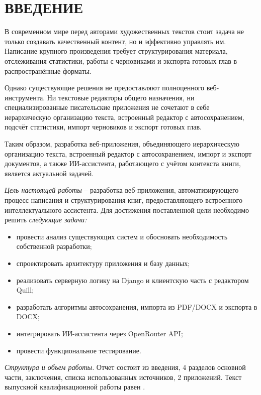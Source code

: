 \section*{ВВЕДЕНИЕ}

В современном мире перед авторами художественных текстов стоит задача не только создавать качественный контент, но и эффективно управлять им. Написание крупного произведения требует структурирования материала, отслеживания статистики, работы с черновиками и экспорта готовых глав в распространённые форматы.

Однако существующие решения не предоставляют полноценного веб-инструмента. Ни текстовые редакторы общего назначения, ни специализированные писательские приложения не сочетают в себе иерархическую организацию текста, встроенный редактор с автосохранением, подсчёт статистики, импорт черновиков и экспорт готовых глав.

Таким образом, разработка веб-приложения, объединяющего иерархическую организацию текста, встроенный редактор с автосохранением, импорт и экспорт документов, а также ИИ-ассистента, работающего с учётом контекста книги, является актуальной задачей.

\emph{Цель настоящей работы} -- разработка веб-приложения, автоматизирующего процесс написания и структурирования книг, предоставляющего встроенного интеллектуального ассистента. Для достижения поставленной цели необходимо решить \emph{следующие задачи:}
\begin{itemize}
    \item провести анализ существующих систем и обосновать необходимость собственной разработки;
    \item спроектировать архитектуру приложения и базу данных;
    \item реализовать серверную логику на Django и клиентскую часть с редактором Quill;
    \item разработать алгоритмы автосохранения, импорта из PDF/DOCX и экспорта в DOCX;
    \item интегрировать ИИ-ассистента через OpenRouter API;
    \item провести функциональное тестирование.
\end{itemize}

\emph{Структура и объем работы.} Отчет состоит из введения, 4 разделов основной части, заключения, списка использованных источников, 2 приложений. Текст выпускной квалификационной работы равен .

